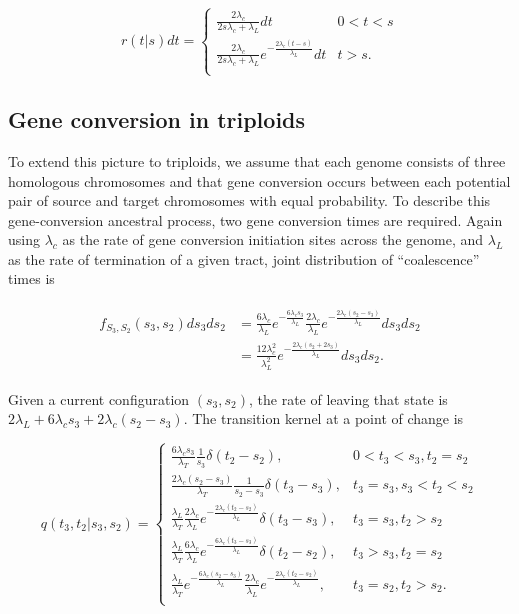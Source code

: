 \documentclass{article}
\begin{document}
\begin{equation}
    r(t|s)dt = 
    \begin{cases}
        \frac{2\lambda_c}{2s\lambda_c+\lambda_L}dt & 0<t<s\\
        \frac{2\lambda_c}{2s\lambda_c+\lambda_L}e^{-\frac{2\lambda_c(t-s)}{\lambda_L}}dt &  t>s.\\
    \end{cases}
\end{equation}

\subsection{Gene conversion in triploids}

To extend this picture to triploids, we assume that each genome consists of
three homologous chromosomes and that gene conversion occurs between each
potential pair of source and target chromosomes with equal probability. To
describe this gene-conversion ancestral process, two gene conversion times are
required. Again using $\lambda_c$ as the rate of gene conversion initiation
sites across the genome, and $\lambda_L$ as the rate of termination of a given
tract, joint distribution of ``coalescence'' times is

\begin{align}
    \begin{split}
        f_{S_3,S_2}(s_3,s_2)ds_3ds_2 &=
            \frac{6\lambda_c}{\lambda_L}e^{-\frac{6\lambda_cs_3}{\lambda_L}}
            \frac{2\lambda_c}{\lambda_L}e^{-\frac{2\lambda_c(s_2-s_3)}{\lambda_L}}ds_3ds_2\\
            &=
            \frac{12\lambda_c^2}{\lambda_L^2}e^{-\frac{2\lambda_c(s_2+2s_3)}{\lambda_L}}ds_3ds_2.
    \end{split}
\end{align}

Given a current configuration $(s_3, s_2)$, the rate of leaving that state is
$2\lambda_L + 6\lambda_cs_3 + 2\lambda_c(s_2-s_3)$. The transition kernel at a
point of change is

\begin{equation}
    q(t_3,t_2|s_3,s_2) =
    \begin{cases}
        \frac{6\lambda_cs_3}{\lambda_T}\frac{1}{s_3}\delta(t_2-s_2), & 0<t_3<s_3, t_2=s_2\\[0.75em]
        \frac{2\lambda_c(s_2-s_3)}{\lambda_T}\frac{1}{s_2-s_3}\delta(t_3-s_3), & t_3=s_3, s_3 < t_2 < s_2\\[0.75em]
        \frac{\lambda_L}{\lambda_T}\frac{2\lambda_c}{\lambda_L}e^{-\frac{2\lambda_c(t_2-s_2)}{\lambda_L}}\delta(t_3-s_3),&t_3=s_3,t_2>s_2\\[0.75em]
        \frac{\lambda_L}{\lambda_T}\frac{6\lambda_c}{\lambda_L}e^{-\frac{6\lambda_c(t_3-s_3)}{\lambda_L}}\delta(t_2-s_2),&t_3>s_3,t_2=s_2\\[0.75em]
        \frac{\lambda_L}{\lambda_T}e^{-\frac{6\lambda_c(s_2-s_3)}{\lambda_L}}\frac{2\lambda_c}{\lambda_L}e^{-\frac{2\lambda_c(t_2-s_2)}{\lambda_L}},&t_3=s_2,t_2>s_2.\\[0.75em]
    \end{cases}
\end{equation}
\end{document}
